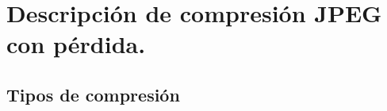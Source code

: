 \chapter{Descripción de compresión JPEG con pérdida.}\label{ch:jpeg_desc}

\section{Tipos de compresión}


%
